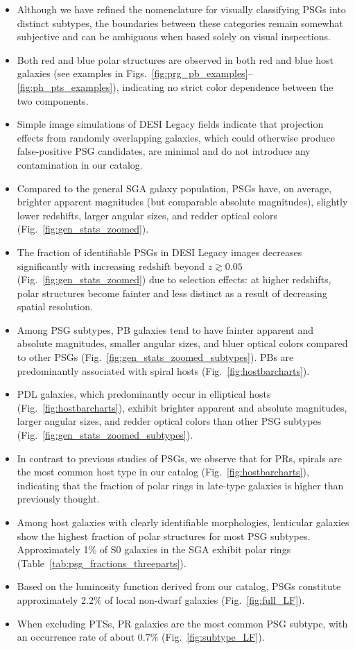 \documentclass{aa}
\begin{document}
\begin{itemize}
    \item Although we have refined the nomenclature for visually classifying PSGs into distinct subtypes, the boundaries between these categories remain somewhat subjective and can be ambiguous when based solely on visual inspections.
    \item Both red and blue polar structures are observed in both red and blue host galaxies (see examples in Figs.~\ref{fig:prg_pb_examples}--\ref{fig:ph_pts_examples}), indicating no strict color dependence between the two components.
    \item Simple image simulations of DESI Legacy fields indicate that projection effects from randomly overlapping galaxies, which could otherwise produce false-positive PSG candidates, are minimal and do not introduce any contamination in our catalog.
    \item Compared to the general SGA galaxy population, PSGs have, on average, brighter apparent magnitudes (but comparable absolute magnitudes), slightly lower redshifts, larger angular sizes, and redder optical colors (Fig.~\ref{fig:gen_stats_zoomed}).
    \item The fraction of identifiable PSGs in DESI Legacy images decreases significantly with increasing redshift beyond $z\gtrsim0.05$ (Fig.~\ref{fig:gen_stats_zoomed}) due to selection effects: at higher redshifts, polar structures become fainter and less distinct as a result of decreasing spatial resolution. 
    \item Among PSG subtypes, PB galaxies tend to have fainter apparent and absolute magnitudes, smaller angular sizes, and bluer optical colors compared to other PSGs (Fig.~\ref{fig:gen_stats_zoomed_subtypes}). PBs are predominantly associated with spiral hosts (Fig.~\ref{fig:hostbarcharts}).
    \item PDL galaxies, which predominantly occur in elliptical hosts (Fig.~\ref{fig:hostbarcharts}), exhibit brighter apparent and absolute magnitudes, larger angular sizes, and redder optical colors than other PSG subtypes (Fig.~\ref{fig:gen_stats_zoomed_subtypes}).
    \item In contrast to previous studies of PSGs, we observe that for PRs, spirals are the most common host type in our catalog (Fig.~\ref{fig:hostbarcharts}), indicating that the fraction of polar rings in late-type galaxies is higher than previously thought.
    \item Among host galaxies with clearly identifiable morphologies, lenticular galaxies show the highest fraction of polar structures for most PSG subtypes. Approximately 1\% of S0 galaxies in the SGA exhibit polar rings (Table~\ref{tab:psg_fractions_threeparts}).
    \item Based on the luminosity function derived from our catalog, PSGs constitute approximately 2.2\% of local non-dwarf galaxies (Fig.~\ref{fig:full_LF}).
    \item When excluding PTSs, PR galaxies are the most common PSG subtype, with an occurrence rate of about 0.7\% (Fig.~\ref{fig:subtype_LF}).
\end{itemize}
\end{document}
